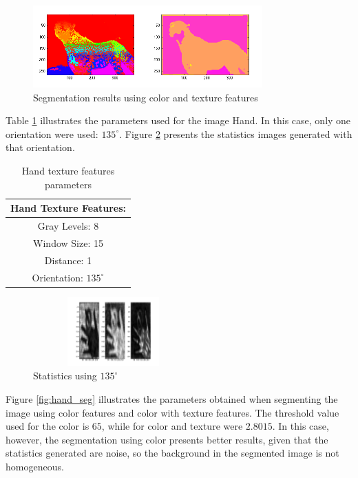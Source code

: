 \documentclass{IEEEtran}
\begin{document}
\begin{figure}[h!] 
 \centering
 \includegraphics[width=250pt]{./fig/feli/fres_all_58.png}%
 \caption{Segmentation results using color and texture features}
 \label{fig:feli_seg}
\end{figure}

Table \ref{tb:param_hand} illustrates the parameters used for the image Hand. In this case, only one orientation were used: $135^{\circ}$. Figure \ref{fig:hand_135} presents the statistics images generated with that orientation.

\begin{table}[h!] 
\centering
\begin{tabular}{|c|}
\hline
Hand Texture Features:\\
\hline
  Gray Levels:   8\\
  Window Size: 15\\
  Distance:   1 \\
  Orientation: $135^{\circ}$\\
\hline
\end{tabular}
\caption{Hand texture features parameters}
\label{tb:param_hand}
\end{table}


\begin{figure}[h!] 
 \centering
 \includegraphics[width=175pt,height=75pt]{./fig/hand/fstats_1_135_end_5.png}%
 \caption{Statistics using $135^{\circ}$}
 \label{fig:hand_135}
\end{figure}

Figure \ref{fig:hand_seg} illustrates the parameters obtained when segmenting the image using color features and color with texture features. The threshold value used for the color is $65$, while for color and texture were $2.8015$. In this case, however, the segmentation using color presents better results, given that the statistics generated are noise, so the background in the segmented image is not homogeneous.
\end{document}
